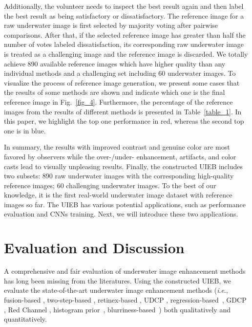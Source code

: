 \documentclass[journal]{IEEEtran}
\newcommand{\ie}{\textit{i}.\textit{e}.}
\begin{document}
Additionally, the volunteer needs to inspect the best result again and then label the best result as being satisfactory or dissatisfactory. The reference image for a raw underwater image is first selected by majority voting after pairwise comparisons. After that, if the selected reference image has greater than half the number of votes labeled dissatisfaction, its corresponding raw underwater image is treated as a challenging image and the reference image is discarded. We totally achieve 890 available reference images which have higher quality than any individual methods and a challenging set including 60 underwater images. To visualize the process of reference image generation, we present some cases that the results of some methods are shown and indicate which one is the final reference image in Fig.~\ref{fig_4}. Furthermore, the percentage of the reference images from the results of different methods is presented in Table~\ref{table_1}. In this paper, we highlight the top one performance in red, whereas the second top one is in blue.



In summary, the results with improved contrast and genuine color are most favored by observers while the over-/under- enhancement, artifacts, and color casts lead to visually unpleasing results. Finally, the constructed UIEB includes two subsets: 890 raw underwater images with the corresponding high-quality reference images; 60 challenging underwater images. To the best of our knowledge, it is the first real-world underwater image dataset with reference images so far. The UIEB has various potential applications, such as performance evaluation and CNNs training. Next, we will introduce these two applications.




\section{Evaluation and Discussion}

A comprehensive and fair evaluation of underwater image enhancement methods has long been missing from the literatures. Using the constructed UIEB, we evaluate the state-of-the-art underwater image enhancement methods (\ie, fusion-based \cite{Ancuti2012}, two-step-based \cite{Fu2017}, retinex-based \cite{Fu2014}, UDCP \cite{Drews2016}, regression-based~\cite{Li2017prl}, GDCP \cite{Peng2018}, Red Channel \cite{Galdran2015}, histogram prior~\cite{Li2016}, blurriness-based~\cite{Peng2017}) both qualitatively and quantitatively.
\end{document}
